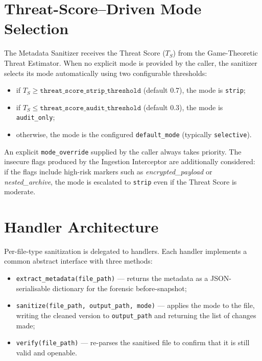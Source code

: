 \documentclass[12pt, a4paper]{report}
\begin{document}
\section{Threat-Score--Driven Mode Selection}

The Metadata Sanitizer receives the Threat Score ($T_S$) from the
Game-Theoretic Threat Estimator. When no explicit mode is provided by
the caller, the sanitizer selects its mode automatically using two
configurable thresholds:

\begin{itemize}
    \item if $T_S \geq \texttt{threat\_score\_strip\_threshold}$
          (default 0.7), the mode is \texttt{strip};
    \item if $T_S \leq \texttt{threat\_score\_audit\_threshold}$
          (default 0.3), the mode is \texttt{audit\_only};
    \item otherwise, the mode is the configured \texttt{default\_mode}
          (typically \texttt{selective}).
\end{itemize}

An explicit \texttt{mode\_override} supplied by the caller always takes
priority. The insecure flags produced by the Ingestion Interceptor are
additionally considered: if the flags include high-risk markers such
as \emph{encrypted\_payload} or \emph{nested\_archive}, the mode is
escalated to \texttt{strip} even if the Threat Score is moderate.

\section{Handler Architecture}

Per-file-type sanitization is delegated to handlers. Each handler
implements a common abstract interface with three methods:

\begin{itemize}
    \item \texttt{extract\_metadata(file\_path)} --- returns the
          metadata as a JSON-serialisable dictionary for the forensic
          before-snapshot;
    \item \texttt{sanitize(file\_path, output\_path, mode)} --- applies
          the mode to the file, writing the cleaned version to
          \texttt{output\_path} and returning the list of changes made;
    \item \texttt{verify(file\_path)} --- re-parses the sanitised file
          to confirm that it is still valid and openable.
\end{itemize}
\end{document}
